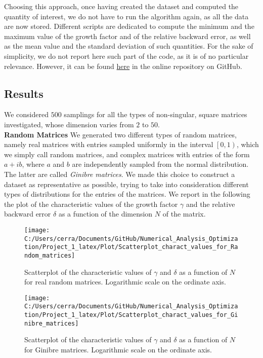 \documentclass[a4paper,11pt]{report}
\begin{document}
\noindent Choosing this approach, once having created the dataset and computed the quantity of interest, we do not have to run the algorithm again, as all the data are now stored. Different scripts are dedicated to compute the minimum and the maximum value of the growth factor and of the relative backward error, as well as the mean value and the standard deviation of such quantities. For the sake of simplicity, we do not report here such part of the code, as it is of no particular relevance. However, it can be found \href{https://github.com/nunziacerrato/Numerical_Analysis_Optimization/blob/main/Project_1/Statistics_Project_1.py}{here} in the online repository on GitHub.

\subsection*{Results}
We considered $500$ samplings for all the types of non-singular, square matrices investigated, whose dimension varies from $2$ to $50$.\\

\noindent \textbf{Random Matrices } We generated two different types of random matrices, namely real matrices with entries sampled uniformly in the interval $\left[0,1\right)$, which we simply call random matrices, and complex matrices with entries of the form $a+ib$, where $a$ and $b$ are independently sampled from the normal distribution. The latter are called \textit{Ginibre matrices}. We made this choice to construct a dataset as representative as possible, trying to take into consideration different types of distributions for the entries of the matrices. We report in the following the plot of the characteristic values of the growth factor $\gamma$ and the relative backward error $\delta$ as a function of the dimension $N$ of the matrix.

\begin{figure}[H]
	\centering
	\texttt{[image: C:/Users/cerra/Documents/GitHub/Numerical\_Analysis\_Optimization/Project\_1\_latex/Plot/Scatterplot\_charact\_values\_for\_Random\_matrices]}
	\caption{Scatterplot of the characteristic values of $\gamma$ and $\delta$ as a function of $N$ for real random matrices. Logarithmic scale on the ordinate axis.}
	\label{fig:Scatterplot_Random}
\end{figure}

\begin{figure}[H]
	\centering
	\texttt{[image: C:/Users/cerra/Documents/GitHub/Numerical\_Analysis\_Optimization/Project\_1\_latex/Plot/Scatterplot\_charact\_values\_for\_Ginibre\_matrices]}
	\caption{Scatterplot of the characteristic values of $\gamma$ and $\delta$ as a function of $N$ for Ginibre matrices. Logarithmic scale on the ordinate axis.}
	\label{fig:Scatterplot_Ginibre}
\end{figure}
	
\end{document}
